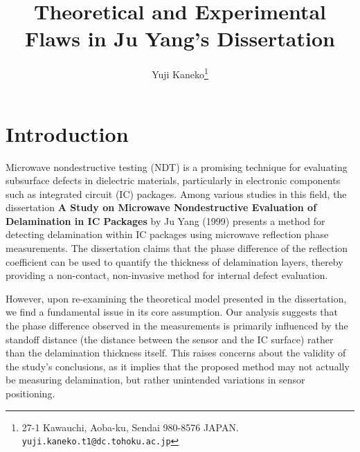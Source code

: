 \documentclass[10pt,twocolumn]{article}
\title{Theoretical and Experimental Flaws in Ju Yang’s Dissertation}
\author{Yuji Kaneko\thanks{27-1 Kawauchi, Aoba-ku, Sendai 980-8576 JAPAN. \texttt{yuji.kaneko.t1@dc.tohoku.ac.jp}}}
\begin{document}

\section{Introduction}

Microwave nondestructive testing (NDT) is a promising technique for evaluating subsurface defects in dielectric materials, particularly in electronic components such as integrated circuit (IC) packages. Among various studies in this field, the dissertation \textbf{A Study on Microwave Nondestructive Evaluation of Delamination in IC Packages} \cite{1} by Ju Yang (1999) presents a method for detecting delamination within IC packages using microwave reflection phase measurements. The dissertation claims that the phase difference of the reflection coefficient can be used to quantify the thickness of delamination layers, thereby providing a non-contact, non-invasive method for internal defect evaluation.

However, upon re-examining the theoretical model presented in the dissertation, we find a fundamental issue in its core assumption. Our analysis suggests that the phase difference observed in the measurements is primarily influenced by the standoff distance (the distance between the sensor and the IC surface) rather than the delamination thickness itself. This raises concerns about the validity of the study's conclusions, as it implies that the proposed method may not actually be measuring delamination, but rather unintended variations in sensor positioning.
\end{document}
